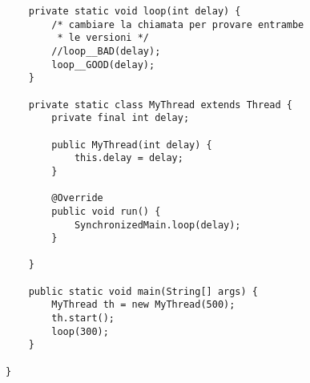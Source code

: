 \begin{lstlisting}
    private static void loop(int delay) {
        /* cambiare la chiamata per provare entrambe
         * le versioni */
        //loop__BAD(delay);
        loop__GOOD(delay);
    }

    private static class MyThread extends Thread {
        private final int delay;

        public MyThread(int delay) {
            this.delay = delay;
        }

        @Override
        public void run() {
            SynchronizedMain.loop(delay);
        }

    }

    public static void main(String[] args) {
        MyThread th = new MyThread(500);
        th.start();
        loop(300);
    }

}
\end{lstlisting}




